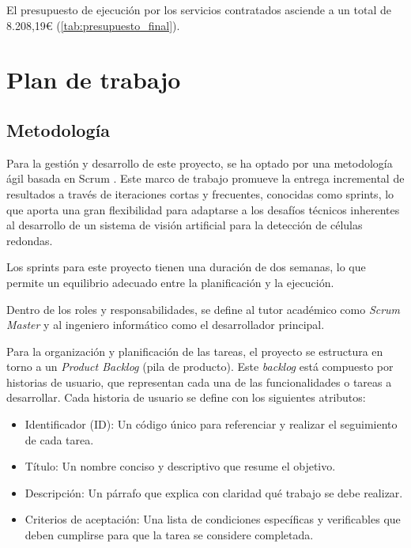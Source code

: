\documentclass[12pt,a4paper,onecolumn,oneside]{report}
\begin{document}
El presupuesto de ejecución por los servicios contratados asciende a un total de 8.208,19\euro{} (\autoref{tab:presupuesto_final}).

\section{Plan de trabajo}
\label{Plan de trabajo}

\subsection{Metodología}
\label{Metodología}

Para la gestión y desarrollo de este proyecto, se ha optado por una metodología ágil basada en Scrum \cite{scrum_org_what_is_scrum}.
Este marco de trabajo promueve la entrega incremental de resultados a través de iteraciones cortas y frecuentes, conocidas como sprints, 
lo que aporta una gran flexibilidad para adaptarse a los desafíos técnicos inherentes al desarrollo de un sistema de visión artificial 
para la detección de células redondas.

Los sprints para este proyecto tienen una duración de dos semanas, lo que permite un equilibrio adecuado entre la planificación y la ejecución.

Dentro de los roles y responsabilidades, se define al tutor académico como \textit{Scrum Master} y al ingeniero informático como el desarrollador principal.

Para la organización y planificación de las tareas, el proyecto se estructura en torno a un \textit{Product Backlog} (pila de producto). Este \textit{backlog} está 
compuesto por historias de usuario, que representan cada una de las funcionalidades o tareas a desarrollar. Cada historia de usuario se define con los siguientes atributos:

\begin{itemize}
  \item Identificador (ID): Un código único para referenciar y realizar el seguimiento de cada tarea.
  \item Título: Un nombre conciso y descriptivo que resume el objetivo.
  \item Descripción: Un párrafo que explica con claridad qué trabajo se debe realizar.
  \item Criterios de aceptación: Una lista de condiciones específicas y verificables que deben cumplirse para que la tarea se considere completada.
\end{itemize}
\end{document}

